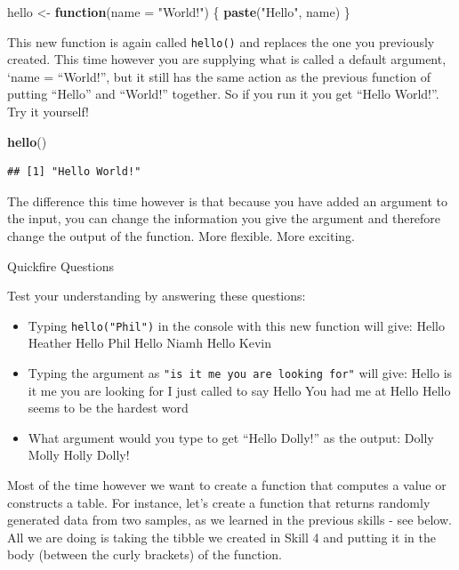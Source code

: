 \documentclass[]{book}
\newenvironment{Shaded}{\begin{snugshade}}{\end{snugshade}}
\newcommand{\ControlFlowTok}[1]{\textcolor[rgb]{0.13,0.29,0.53}{\textbf{#1}}}
\newcommand{\DataTypeTok}[1]{\textcolor[rgb]{0.13,0.29,0.53}{#1}}
\newcommand{\KeywordTok}[1]{\textcolor[rgb]{0.13,0.29,0.53}{\textbf{#1}}}
\newcommand{\NormalTok}[1]{#1}
\newcommand{\StringTok}[1]{\textcolor[rgb]{0.31,0.60,0.02}{#1}}
\begin{document}
\begin{Shaded}
\begin{Highlighting}[]
\NormalTok{hello <-}\StringTok{ }\ControlFlowTok{function}\NormalTok{(}\DataTypeTok{name =} \StringTok{"World!"}\NormalTok{) \{}
  \KeywordTok{paste}\NormalTok{(}\StringTok{"Hello"}\NormalTok{, name)}
\NormalTok{\}}
\end{Highlighting}
\end{Shaded}

This new function is again called \texttt{hello()} and replaces the one you previously created. This time however you are supplying what is called a default argument, `name = ``World!'', but it still has the same action as the previous function of putting ``Hello'' and ``World!'' together. So if you run it you get ``Hello World!''. Try it yourself!

\begin{Shaded}
\begin{Highlighting}[]
\KeywordTok{hello}\NormalTok{()}
\end{Highlighting}
\end{Shaded}

\begin{verbatim}
## [1] "Hello World!"
\end{verbatim}

The difference this time however is that because you have added an argument to the input, you can change the information you give the argument and therefore change the output of the function. More flexible. More exciting.

{Quickfire Questions}

Test your understanding by answering these questions:

\begin{itemize}
\item
  Typing \texttt{hello("Phil")} in the console with this new function will give: Hello Heather Hello Phil Hello Niamh Hello Kevin
\item
  Typing the argument as \texttt{"is\ it\ me\ you\ are\ looking\ for"} will give: Hello is it me you are looking for I just called to say Hello You had me at Hello Hello seems to be the hardest word
\item
  What argument would you type to get ``Hello Dolly!'' as the output: Dolly Molly Holly Dolly!
\end{itemize}

Most of the time however we want to create a function that computes a value or constructs a table. For instance, let's create a function that returns randomly generated data from two samples, as we learned in the previous skills - see below. All we are doing is taking the tibble we created in Skill 4 and putting it in the body (between the curly brackets) of the function.
\end{document}
